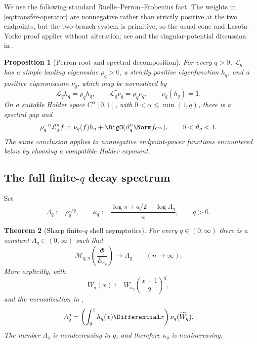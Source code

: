 \documentclass[11pt,oneside]{article}
\newtheorem{theorem}{Theorem}[section]
\newtheorem{proposition}[theorem]{Proposition}
\theoremstyle{definition}
\theoremstyle{remark}
\newcommand{\Phiup}{\Phi}
\begin{document}
We use the following standard Ruelle--Perron--Frobenius fact.  The weights in
\eqref{eq:transfer-operator} are nonnegative rather than strictly positive at the two
endpoints, but the two-branch system is primitive, so the usual cone and
Lasota--Yorke proof applies without alteration; see \cite[Chs.~2--3]{baladi} and the
singular-potential discussion in \cite{fan1997,fan-schmeling-shen}.

\begin{proposition}[Perron root and spectral decomposition]
\label{prop:RPF}
For every $q>0$, $\mathcal L_q$ has a simple leading eigenvalue
$\rho_q>0$, a strictly positive eigenfunction $h_q$, and a positive eigenmeasure $\nu_q$,
which may be normalized by
\[
 \mathcal L_qh_q=\rho_qh_q,
 \qquad
 \mathcal L_q^*\nu_q=\rho_q\nu_q,
 \qquad
 \nu_q(h_q)=1.
\]
On a suitable Holder space $C^\alpha[0,1]$, with
$0<\alpha\le\min(1,q)$, there is a spectral gap and
\begin{equation}
 \rho_q^{-n}\mathcal L_q^nf
 =\nu_q(f)h_q+\BigO(\vartheta_q^n\Norm f_{C^\alpha}),
 \qquad 0<\vartheta_q<1.
 \label{eq:RPF-convergence}
\end{equation}
The same conclusion applies to nonnegative endpoint-power functions encountered below by
choosing a compatible Holder exponent.
\end{proposition}

\subsection{The full finite-$q$ decay spectrum}

Set
\begin{equation}
 \Lambda_q:=\rho_q^{1/q},
 \qquad
 \kappa_q:=\frac{\log\pi+a/2-\log\Lambda_q}{a},
 \qquad q>0.
 \label{eq:kappa-q}
\end{equation}

\begin{theorem}[Sharp finite-$q$ shell asymptotics]
\label{thm:Lq-spectrum}
For every $q\in(0,\infty)$ there is a constant $A_q\in(0,\infty)$ such that
\begin{equation}
 \mathcal M_{q,n}\!\left(\frac{\Phiup}{E_{\kappa_q}}\right)
 \longrightarrow A_q
 \qquad(n\to\infty).
 \label{eq:Lq-limit}
\end{equation}
More explicitly, with
\[
 \widetilde W_{q}(x)
 :=W_{\kappa_q}\!\left(\frac{x+1}{2}\right)^q,
\]
and the normalization in ,
\begin{equation}
 A_q^q=\left(\int_0^1h_q(x)\Differential x\right)\nu_q(\widetilde W_q).
 \label{eq:Aq}
\end{equation}
The number $\Lambda_q$ is nondecreasing in $q$, and therefore $\kappa_q$ is nonincreasing.
\end{theorem}
\end{document}
